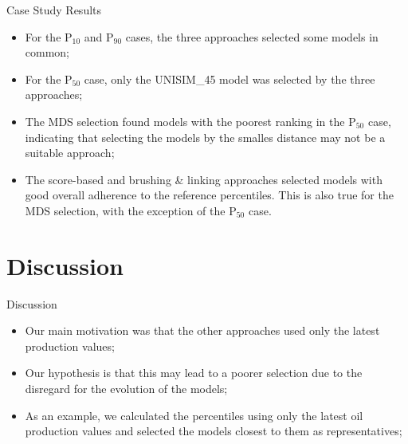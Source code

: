 \documentclass{beamer}
\begin{document}
\begin{frame}{Case Study Results}
  \begin{itemize}
    \item For the P$_{10}$ and P$_{90}$ cases, the three approaches selected some models in common;
    \item For the P$_{50}$ case, only the UNISIM\_45 model was selected by the three approaches;
    \item The MDS selection found models with the poorest ranking in the P$_{50}$ case, indicating that selecting the models by the smalles distance may not be a suitable approach;
    \item The score-based and brushing \& linking approaches selected models with good overall adherence to the reference percentiles. This is also true for the MDS selection, with the exception of the P$_{50}$ case.
  \end{itemize}
\end{frame}

\section{Discussion}
\begin{frame}
  \tableofcontents[currentsection]
\end{frame}

\begin{frame}{Discussion}
  \begin{itemize}
    \item Our main motivation was that the other approaches used only the latest production values;
    \item Our hypothesis is that this may lead to a poorer selection due to the disregard for the evolution of the models;
    \item As an example, we calculated the percentiles using only the latest oil production values and selected the models closest to them as representatives;
  \end{itemize}
\end{frame}
\end{document}
